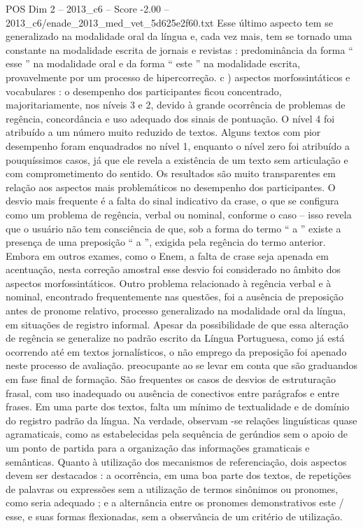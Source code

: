 \begin{textsample}{POS Dim 2 – 2013\_c6 – Score -2.00 – 2013\_c6/enade\_2013\_med\_vet\_5d625e2f60.txt}
Esse último aspecto tem se generalizado na modalidade oral da língua e, cada vez mais, tem se tornado uma constante na modalidade escrita de jornais e revistas : predominância da forma “ esse ” na modalidade oral e da forma “ este ” na modalidade escrita, provavelmente por um processo de hipercorreção. c ) aspectos morfossintáticos e vocabulares : o desempenho dos participantes ficou concentrado, majoritariamente, nos níveis 3 e 2, devido à grande ocorrência de problemas de regência, concordância e uso adequado dos sinais de pontuação.
O nível 4 foi atribuído a um número muito reduzido de textos.
Alguns textos com pior desempenho foram enquadrados no nível 1, enquanto o nível zero foi atribuído a pouquíssimos casos, já que ele revela a existência de um texto sem articulação e com comprometimento do sentido.
Os resultados são muito transparentes em relação aos aspectos mais problemáticos no desempenho dos participantes.
O desvio mais frequente é a falta do sinal indicativo da crase, o que se configura como um problema de regência, verbal ou nominal, conforme o caso – isso revela que o usuário não tem consciência de que, sob a forma do termo “ a ” existe a presença de uma preposição “ a ”, exigida pela regência do termo anterior.
Embora em outros exames, como o Enem, a falta de crase seja apenada em acentuação, nesta correção amostral esse desvio foi considerado no âmbito dos aspectos morfossintáticos.
Outro problema relacionado à regência verbal e à nominal, encontrado frequentemente nas questões, foi a ausência de preposição antes de pronome relativo, processo generalizado na modalidade oral da língua, em situações de registro informal.
Apesar da possibilidade de que essa alteração de regência se generalize no padrão escrito da Língua Portuguesa, como já está ocorrendo até em textos jornalísticos, o não emprego da preposição foi apenado neste processo de avaliação. preocupante ao se levar em conta que são graduandos em fase final de formação.
São frequentes os casos de desvios de estruturação frasal, com uso inadequado ou ausência de conectivos entre parágrafos e entre frases.
Em uma parte dos textos, falta um mínimo de textualidade e de domínio do registro padrão da língua.
Na verdade, observam -se relações linguísticas quase agramaticais, como as estabelecidas pela sequência de gerúndios sem o apoio de um ponto de partida para a organização das informações gramaticais e semânticas.
Quanto à utilização dos mecanismos de referenciação, dois aspectos devem ser destacados : a ocorrência, em uma boa parte dos textos, de repetições de palavras ou expressões sem a utilização de termos sinônimos ou pronomes, como seria adequado ; e a alternância entre os pronomes demonstrativos este / esse, e suas formas flexionadas, sem a observância de um critério de utilização.

\end{textsample}
